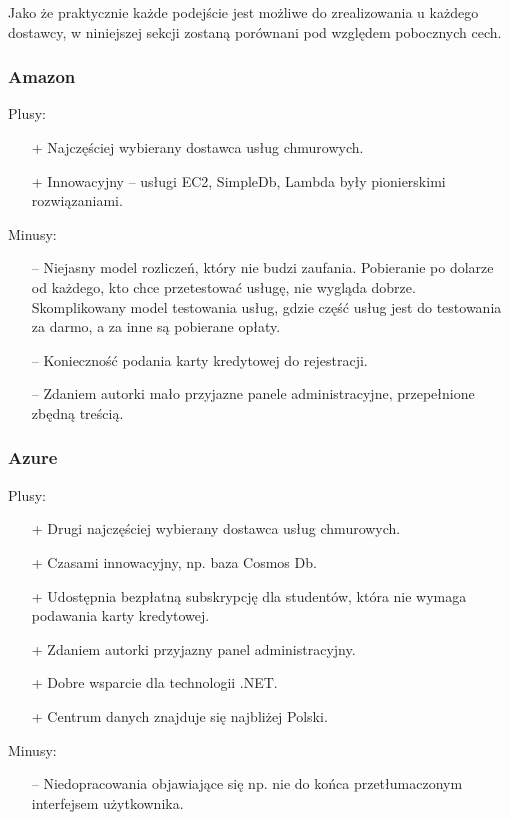 \documentclass[12pt,a4paper,twoside,titlepage,openright]{book}
\begin{document}
Jako że praktycznie każde podejście jest możliwe do zrealizowania u każdego dostawcy, w niniejszej sekcji zostaną porównani pod względem pobocznych cech.

\subsubsection{Amazon}

Plusy:
\begin{itemize}
\item[+] Najczęściej wybierany dostawca usług chmurowych.
\item[+] Innowacyjny -- usługi EC2, SimpleDb, Lambda były pionierskimi rozwiązaniami.
\end{itemize}

\noindent
Minusy:
\begin{itemize}
\item[--] Niejasny model rozliczeń, który nie budzi zaufania. Pobieranie po dolarze od każdego, kto chce przetestować usługę, nie wygląda dobrze. Skomplikowany model testowania usług, gdzie część usług jest do testowania za darmo, a za inne są pobierane opłaty. 
\item[--] Konieczność podania karty kredytowej do rejestracji.
\item[--] Zdaniem autorki mało przyjazne panele administracyjne, przepełnione zbędną treścią.
\end{itemize}

\subsubsection{Azure}

Plusy:
\begin{itemize}
\item[+] Drugi najczęściej wybierany dostawca usług chmurowych.
\item[+] Czasami innowacyjny, np. baza Cosmos Db.
\item[+] Udostępnia bezpłatną subskrypcję dla studentów, która nie wymaga podawania karty kredytowej.
\item[+] Zdaniem autorki przyjazny panel administracyjny.
\item[+] Dobre wsparcie dla technologii .NET.
\item[+] Centrum danych znajduje się najbliżej Polski.
\end{itemize}

\noindent
Minusy:
\begin{itemize}
\item[--] Niedopracowania objawiające się np. nie do końca przetłumaczonym interfejsem użytkownika.
\end{itemize}
\end{document}
